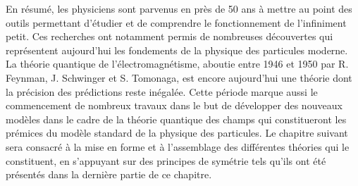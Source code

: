         \vspace{10pt}
        En résumé, les physiciens sont parvenus en près de 50 ans à mettre au point des outils permettant d'étudier et de comprendre le fonctionnement de l'infiniment petit. Ces recherches ont notamment permis de nombreuses découvertes qui représentent aujourd'hui les fondements de la physique des particules moderne. La théorie quantique de l'électromagnétisme, aboutie entre 1946 et 1950 par R. Feynman, J. Schwinger et S. Tomonaga, est encore aujourd'hui une théorie dont la précision des prédictions reste inégalée. Cette période marque aussi le commencement de nombreux travaux dans le but de développer des nouveaux modèles dans le cadre de la théorie quantique des champs qui constitueront les prémices du modèle standard de la physique des particules. Le chapitre suivant sera consacré à la mise en forme et à l'assemblage des différentes théories qui le constituent, en s'appuyant sur des principes de symétrie tels qu'ils ont été présentés dans la dernière partie de ce chapitre.